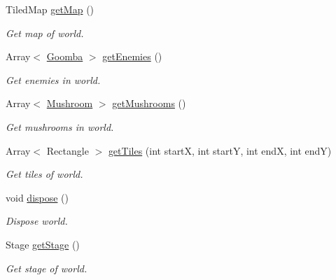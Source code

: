 \begin{DoxyCompactItemize}
Tiled\+Map \hyperlink{classnl_1_1arjanfrans_1_1mario_1_1model_1_1World_a8812c471d0f3e39ab3a0073527baf4d8}{get\+Map} ()
\begin{DoxyCompactList}\small\item\em Get map of world. \end{DoxyCompactList}\item 
Array$<$ \hyperlink{classnl_1_1arjanfrans_1_1mario_1_1model_1_1Goomba}{Goomba} $>$ \hyperlink{classnl_1_1arjanfrans_1_1mario_1_1model_1_1World_a8d4f869faea3c599334975f5511aca9a}{get\+Enemies} ()
\begin{DoxyCompactList}\small\item\em Get enemies in world. \end{DoxyCompactList}\item 
Array$<$ \hyperlink{classnl_1_1arjanfrans_1_1mario_1_1model_1_1Mushroom}{Mushroom} $>$ \hyperlink{classnl_1_1arjanfrans_1_1mario_1_1model_1_1World_a3acf1e0b7bab1db92c5537fbd038f5c5}{get\+Mushrooms} ()
\begin{DoxyCompactList}\small\item\em Get mushrooms in world. \end{DoxyCompactList}\item 
Array$<$ Rectangle $>$ \hyperlink{classnl_1_1arjanfrans_1_1mario_1_1model_1_1World_ae986617591bfcee4c12343588b9a22b7}{get\+Tiles} (int startX, int startY, int endX, int endY)
\begin{DoxyCompactList}\small\item\em Get tiles of world. \end{DoxyCompactList}\item 
\mbox{\label{classnl_1_1arjanfrans_1_1mario_1_1model_1_1World_aa4f564130328b9c3b3cd5ecb0f33985b}} 
void \hyperlink{classnl_1_1arjanfrans_1_1mario_1_1model_1_1World_aa4f564130328b9c3b3cd5ecb0f33985b}{dispose} ()
\begin{DoxyCompactList}\small\item\em Dispose world. \end{DoxyCompactList}\item 
Stage \hyperlink{classnl_1_1arjanfrans_1_1mario_1_1model_1_1World_ac56b0f98a3e839bbb10bf6efec0e487a}{get\+Stage} ()
\begin{DoxyCompactList}\small\item\em Get stage of world. \end{DoxyCompactList}\end{DoxyCompactItemize}

